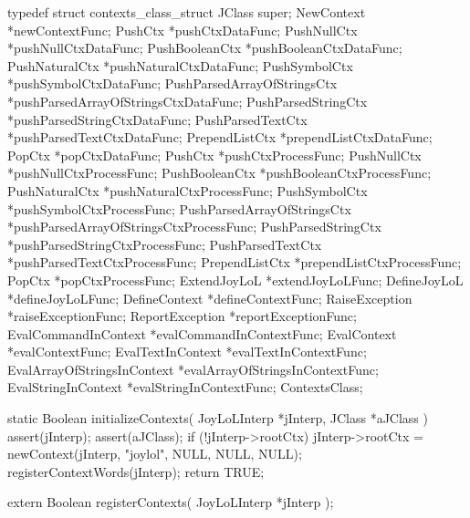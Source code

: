 \startTestSuite[registerContexts]

\startCHeader
typedef struct contexts_class_struct {
  JClass      super;
  NewContext     *newContextFunc;
  PushCtx        *pushCtxDataFunc; 
  PushNullCtx    *pushNullCtxDataFunc;
  PushBooleanCtx *pushBooleanCtxDataFunc;
  PushNaturalCtx *pushNaturalCtxDataFunc;
  PushSymbolCtx  *pushSymbolCtxDataFunc;
  PushParsedArrayOfStringsCtx 
    *pushParsedArrayOfStringsCtxDataFunc;
  PushParsedStringCtx
    *pushParsedStringCtxDataFunc;
  PushParsedTextCtx
    *pushParsedTextCtxDataFunc;
  PrependListCtx *prependListCtxDataFunc;
  PopCtx         *popCtxDataFunc;
  PushCtx        *pushCtxProcessFunc;
  PushNullCtx    *pushNullCtxProcessFunc;
  PushBooleanCtx *pushBooleanCtxProcessFunc;
  PushNaturalCtx *pushNaturalCtxProcessFunc;
  PushSymbolCtx  *pushSymbolCtxProcessFunc;
  PushParsedArrayOfStringsCtx
    *pushParsedArrayOfStringsCtxProcessFunc;
  PushParsedStringCtx
    *pushParsedStringCtxProcessFunc;
  PushParsedTextCtx
    *pushParsedTextCtxProcessFunc;
  PrependListCtx *prependListCtxProcessFunc;
  PopCtx         *popCtxProcessFunc;
  ExtendJoyLoL   *extendJoyLoLFunc;
  DefineJoyLoL   *defineJoyLoLFunc;
  DefineContext  *defineContextFunc;
  RaiseException *raiseExceptionFunc;
  ReportException
    *reportExceptionFunc;
  EvalCommandInContext
    *evalCommandInContextFunc;
  EvalContext    *evalContextFunc;
  EvalTextInContext
    *evalTextInContextFunc;
  EvalArrayOfStringsInContext
    *evalArrayOfStringsInContextFunc;
  EvalStringInContext
    *evalStringInContextFunc;
} ContextsClass;
\stopCHeader

\startCCode
static Boolean initializeContexts(
  JoyLoLInterp *jInterp,
  JClass   *aJClass
) {
  assert(jInterp);
  assert(aJClass);
  if (!jInterp->rootCtx) {
    jInterp->rootCtx =
      newContext(jInterp, "joylol", NULL, NULL, NULL);
  }
  registerContextWords(jInterp);
  return TRUE;
}
\stopCCode

\startCHeader
extern Boolean registerContexts(
  JoyLoLInterp *jInterp
);
\stopCHeader
{}

